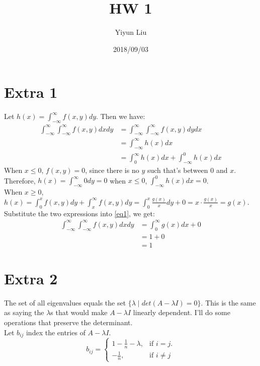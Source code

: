 \documentclass{article}
\title{HW 1}
\date{2018/09/03}
\author{Yiyun Liu}
\begin{document}
\maketitle
\lstset{basicstyle=\ttfamily}

\section*{Extra 1}
Let $h(x)=\int_{-\infty}^{\infty}f(x,y)dy$. Then we have:\\
\begin{equation} \label{eq1}
  \begin{split}
    \int_{-\infty}^{\infty}\int_{-\infty}^{\infty}f(x,y)dxdy
    &= \int_{-\infty}^{\infty}\int_{-\infty}^{\infty}f(x,y)dydx \\
    &= \int_{-\infty}^{\infty}h(x)dx\\
    &= \int_{0}^{\infty}h(x)dx + \int_{-\infty}^{0}h(x)dx 
  \end{split}
\end{equation}
When $x\leq 0$, $f(x,y)=0$, since there is no $y$ such that's between $0$ and $x$. Therefore, $h(x)=\int_{-\infty}^{\infty}0dy=0$ when $x\leq 0$, $\int_{-\infty}^{0}h(x)dx=0$.\\
When $x\geq 0$, $h(x)=\int_{0}^{x}f(x,y)dy + \int_{x}^{\infty}f(x,y)dy=\int_{0}^{x}\frac{g(x)}{x}dy+0=x \cdot \frac{g(x)}{x} = g(x)$.\\
Substitute the two expressions into \ref{eq1}, we get:\\
\begin{equation*}
  \begin{split}
    \int_{-\infty}^{\infty}\int_{-\infty}^{\infty}f(x,y)dxdy
    &= \int_{0}^{\infty}g(x)dx + 0\\
    &= 1 + 0\\
    &= 1
  \end{split}
\end{equation*}

\section*{Extra 2}
The set of all eigenvalues equals the set $\{\lambda \mid det(A - \lambda I)= 0\}$. This is the same as saying the $\lambda$s that would make $A-\lambda I$ linearly dependent. I'll do some operations that preserve the determinant.\\

Let $b_{ij}$ index the entries of $A-\lambda I$.
\begin{equation*}
b_{ij}=
\begin{cases}
  1-\frac{1}{n}-\lambda, & \text{if $i=j$}.\\
  -\frac{1}{n}, & \text{if $i \neq j$}
\end{cases}
\end{equation*}
\end{document}
